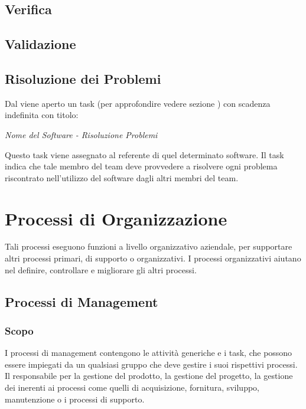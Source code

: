 \documentclass[12pt,a4paper]{article}
\begin{document}
\subsection{Verifica} %

\subsection{Validazione} %

\subsection{Risoluzione dei Problemi}\label{Risoluzione dei Problemi} %
Dal \PM{} viene aperto un task (per approfondire vedere sezione \TODO) con scadenza indefinita con titolo:
\begin{center}
\emph{Nome del Software - Risoluzione Problemi}
\end{center}
Questo task viene assegnato al referente di quel determinato software. Il task indica che tale membro del team deve provvedere a risolvere ogni problema riscontrato nell'utilizzo del software dagli altri membri del team.
\newpage

\section{Processi di Organizzazione} %

Tali processi eseguono funzioni a livello organizzativo aziendale, per supportare altri processi primari, di supporto o organizzativi.
I processi organizzativi aiutano nel definire, controllare e migliorare gli altri processi.

\subsection{Processi di Management}

\subsubsection{Scopo} %

I processi di management contengono le attività generiche e i task, che possono essere impiegati da un qualsiasi gruppo che deve gestire i suoi rispettivi processi. Il \PM{} responsabile per la gestione del prodotto, la gestione del progetto, la gestione dei \textit{} inerenti ai processi come quelli di acquisizione, fornitura, sviluppo, manutenzione o i processi di supporto.
\end{document}
